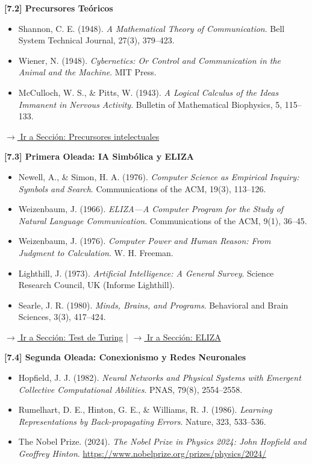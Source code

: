 \documentclass[12pt,a4paper]{report}
\numberwithin{figure}{section}
\begin{document}
\textbf{[7.2] Precursores Teóricos}
\label{ref:7.2}
\begin{itemize}
  \item Shannon, C. E. (1948). \textit{A Mathematical Theory of Communication}. Bell System Technical Journal, 27(3), 379--423.
  \item Wiener, N. (1948). \textit{Cybernetics: Or Control and Communication in the Animal and the Machine}. MIT Press.
  \item McCulloch, W. S., \& Pitts, W. (1943). \textit{A Logical Calculus of the Ideas Immanent in Nervous Activity}. Bulletin of Mathematical Biophysics, 5, 115--133.
\end{itemize}
\vspace{0.3em}
\hfill \hyperref[subsec:nacimiento_ia]{$\rightarrow$ Ir a Sección: Precursores intelectuales}
\vspace{0.5em}

\textbf{[7.3] Primera Oleada: IA Simbólica y ELIZA}
\label{ref:7.3}
\begin{itemize}
  \item Newell, A., \& Simon, H. A. (1976). \textit{Computer Science as Empirical Inquiry: Symbols and Search}. Communications of the ACM, 19(3), 113--126.
  \item Weizenbaum, J. (1966). \textit{ELIZA---A Computer Program for the Study of Natural Language Communication}. Communications of the ACM, 9(1), 36--45.
  \item Weizenbaum, J. (1976). \textit{Computer Power and Human Reason: From Judgment to Calculation}. W. H. Freeman.
  \item Lighthill, J. (1973). \textit{Artificial Intelligence: A General Survey}. Science Research Council, UK (Informe Lighthill).
  \item Searle, J. R. (1980). \textit{Minds, Brains, and Programs}. Behavioral and Brain Sciences, 3(3), 417--424.
\end{itemize}
\vspace{0.3em}
\hfill \hyperref[subsec:test_turing]{$\rightarrow$ Ir a Sección: Test de Turing} | \hyperref[subsubsec:eliza]{$\rightarrow$ Ir a Sección: ELIZA}
\vspace{0.5em}

\textbf{[7.4] Segunda Oleada: Conexionismo y Redes Neuronales}
\begin{itemize}
  \item Hopfield, J. J. (1982). \textit{Neural Networks and Physical Systems with Emergent Collective Computational Abilities}. PNAS, 79(8), 2554--2558.
  \item Rumelhart, D. E., Hinton, G. E., \& Williams, R. J. (1986). \textit{Learning Representations by Back-propagating Errors}. Nature, 323, 533--536.
  \item The Nobel Prize. (2024). \textit{The Nobel Prize in Physics 2024: John Hopfield and Geoffrey Hinton}. \url{https://www.nobelprize.org/prizes/physics/2024/}
\end{itemize}
\end{document}
